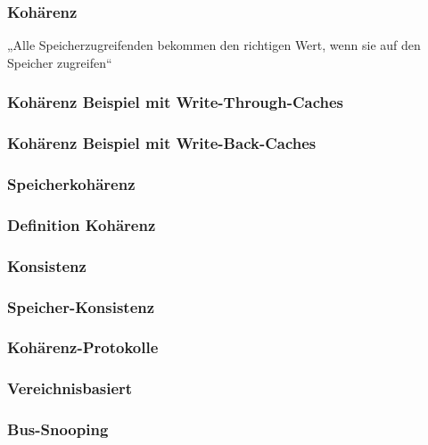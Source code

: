 \subsubsection{Kohärenz}
„Alle Speicherzugreifenden bekommen den richtigen Wert, wenn sie auf den Speicher zugreifen“
\subsubsection*{Kohärenz Beispiel mit Write-Through-Caches}
\subsubsection*{Kohärenz Beispiel mit Write-Back-Caches}

\subsubsection*{Speicherkohärenz}

\subsubsection*{Definition Kohärenz}

\subsubsection{Konsistenz}

\subsubsection*{Speicher-Konsistenz}

\subsubsection{Kohärenz-Protokolle}

\subsubsection*{Vereichnisbasiert}

\subsubsection*{Bus-Snooping}

